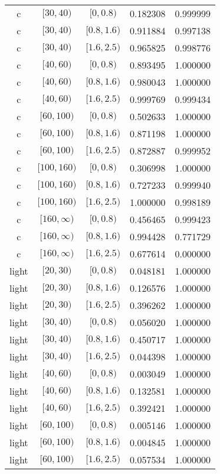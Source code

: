 \documentclass[12pt,a4paper]{article}
\begin{document}
\begin{table}[H]
\begin{center}
\begin{tabular}{ c | c | c | c | c }
		c & $[30,40)$ & $[0,0.8)$ & 0.182308 & 0.999999 \\
		c & $[30,40)$ & $[0.8,1.6)$ & 0.911884 & 0.997138 \\
		c & $[30,40)$ & $[1.6,2.5)$ & 0.965825 & 0.998776 \\
		c & $[40,60)$ & $[0,0.8)$ & 0.893495 & 1.000000 \\
		c & $[40,60)$ & $[0.8,1.6)$ & 0.980043 & 1.000000 \\
		c & $[40,60)$ & $[1.6,2.5)$ & 0.999769 & 0.999434 \\
		c & $[60,100)$ & $[0,0.8)$ & 0.502633 & 1.000000 \\
		c & $[60,100)$ & $[0.8,1.6)$ & 0.871198 & 1.000000 \\
		c & $[60,100)$ & $[1.6,2.5)$ & 0.872887 & 0.999952 \\
		c & $[100,160)$ & $[0,0.8)$ & 0.306998 & 1.000000 \\
		c & $[100,160)$ & $[0.8,1.6)$ & 0.727233 & 0.999940 \\
		c & $[100,160)$ & $[1.6,2.5)$ & 1.000000 & 0.998189 \\
		c & $[160,\infty)$ & $[0,0.8)$ & 0.456465 & 0.999423 \\
		c & $[160,\infty)$ & $[0.8,1.6)$ & 0.994428 & 0.771729 \\
		c & $[160,\infty)$ & $[1.6,2.5)$ & 0.677614 & 0.000000 \\ \hline
		light & $[20,30)$ & $[0,0.8)$ & 0.048181 & 1.000000 \\
		light & $[20,30)$ & $[0.8,1.6)$ & 0.126576 & 1.000000 \\
		light & $[20,30)$ & $[1.6,2.5)$ & 0.396262 & 1.000000 \\
		light & $[30,40)$ & $[0,0.8)$ & 0.056020 & 1.000000 \\
		light & $[30,40)$ & $[0.8,1.6)$ & 0.450717 & 1.000000 \\
		light & $[30,40)$ & $[1.6,2.5)$ & 0.044398 & 1.000000 \\
		light & $[40,60)$ & $[0,0.8)$ & 0.003049 & 1.000000 \\
		light & $[40,60)$ & $[0.8,1.6)$ & 0.132581 & 1.000000 \\
		light & $[40,60)$ & $[1.6,2.5)$ & 0.392421 & 1.000000 \\
		light & $[60,100)$ & $[0,0.8)$ & 0.005146 & 1.000000 \\
		light & $[60,100)$ & $[0.8,1.6)$ & 0.004845 & 1.000000 \\
		light & $[60,100)$ & $[1.6,2.5)$ & 0.057534 & 1.000000 \\

\end{tabular}
\end{center}
\end{table}
\end{document}
